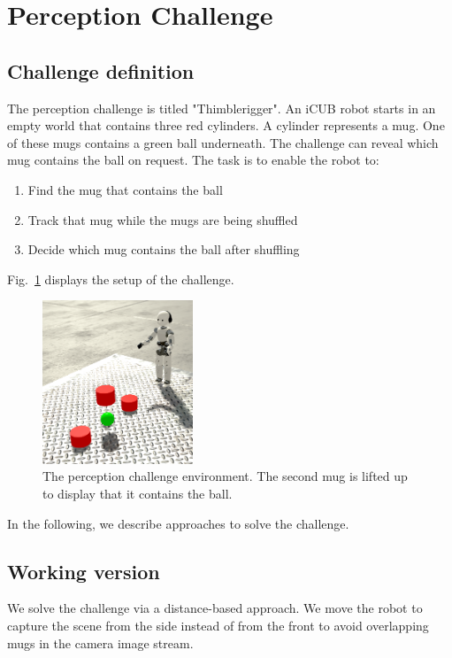 \section{Perception Challenge}

\subsection{Challenge definition}

The perception challenge is titled "Thimblerigger". An iCUB robot starts in an empty world that contains three red cylinders. A cylinder represents a mug.
One of these mugs contains a green ball underneath. The challenge can reveal which mug contains the ball on request.
The task is to enable the robot to: 
\begin{enumerate}
	\item Find the mug that contains the ball
	\item Track that mug while the mugs are being shuffled
	\item Decide which mug contains the ball after shuffling
\end{enumerate}

Fig.~\ref{fig:challenge} displays the setup of the challenge.

\begin{figure}
	\centering
	\includegraphics[width=0.4\textwidth]{logos/challenge}
	\caption{The perception challenge environment. The 	second mug is lifted up to display that it contains the 	ball.}
	\label{fig:challenge}
\end{figure}

In the following, we describe approaches to solve the challenge.

\subsection{Working version}

We solve the challenge via a distance-based approach. We move the robot to capture the scene from the side instead of from the front to avoid overlapping mugs in the camera image stream.

